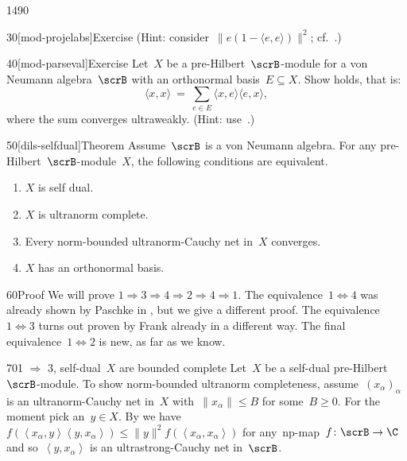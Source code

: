 \begin{parsec}{1490}
\begin{point}{30}[mod-projelabs]{Exercise}
    (Hint: consider~$\| e(1-\langle e, e \rangle) \|^2$;
                 cf.~\cite[thm.~3.12]{paschke}.)
\end{point}
\begin{point}{40}[mod-parseval]{Exercise}
Let~$X$ be a pre-Hilbert~$\scrB$-module for a von Neumann algebra~$\scrB$
    with an orthonormal basis~$E \subseteq X$.
    Show  holds, that is:
\begin{equation*}
    \langle x, x \rangle \ =\ 
    \sum_{e \in E} \langle x, e\rangle \langle e, x\rangle,
\end{equation*}
where the sum converges ultraweakly. \cite{paschke}
(Hint: use~.)
\end{point}
\begin{point}{50}[dils-selfdual]{Theorem}%
    Assume~$\scrB$ is a von Neumann algebra.
    For any pre-Hilbert~$\scrB$-module~$X$,
        the following conditions are equivalent.
        \begin{enumerate}
            \item $X$ is self dual.
            \item $X$ is ultranorm complete.
            \item Every norm-bounded ultranorm-Cauchy net in~$X$ converges.
            \item $X$ has an orthonormal basis.
        \end{enumerate}
        \spacingfix{}
\begin{point}{60}{Proof}%
We will prove $1 \Rightarrow 3 \Rightarrow 4 \Rightarrow 2 \Rightarrow 4 \Rightarrow 1$.
The equivalence~$1 \Leftrightarrow 4$
    was already shown by Paschke in \cite[thm.~3.12]{paschke},
    but we give a different proof.
The equivalence~$1 \Leftrightarrow 3$ turns out
    proven by Frank already \cite[thm.~3.2]{frank1990self}
    in a different way.
The final equivalence~$1 \Leftrightarrow 2$ is new, as far as we know.
\begin{point}{70}{1 $\Rightarrow$ 3, self-dual~$X$ are bounded complete}%
    Let~$X$ be a self-dual pre-Hilbert~$\scrB$-module.
    To show norm-bounded ultranorm completeness,
     assume~$(x_\alpha)_\alpha$ is an ultranorm-Cauchy net in~$X$
        with~$\|x_\alpha\| \leq B$ for some~$B \geq 0$.
     For the moment pick an~$y \in X$.
By  we
    have~$f(\left<x_\alpha,y\right>\left<y,x_\alpha\right>) \leq \|y\|^2
        f(\left<x_\alpha,x_\alpha\right>)$ for any~np-map~$f\colon \scrB \to \C$
        and so~$\left<y,x_\alpha\right>$ is an ultrastrong-Cauchy net in~$\scrB$.

\end{point}
\end{point}
\end{point}
\end{parsec}
